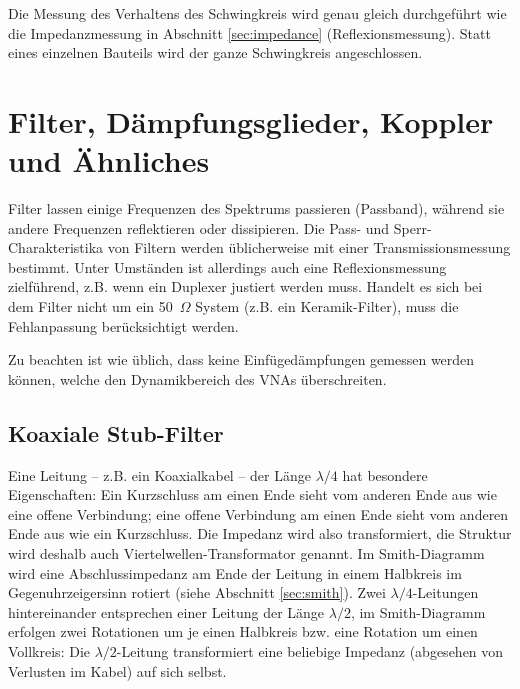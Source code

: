 \documentclass[twoside,a4paper,11pt,halfparskip,DIV=11,notitlepage]{scrartcl}
\begin{document}

Die Messung des Verhaltens des Schwingkreis wird genau gleich durchgeführt wie die
Impedanzmessung in Abschnitt \ref{sec:impedance} (Reflexionsmessung). Statt
eines einzelnen Bauteils wird der ganze Schwingkreis angeschlossen.

\newpage %
\section{Filter, Dämpfungsglieder, Koppler und Ähnliches}\label{sec:filter}
Filter lassen einige Frequenzen des Spektrums passieren (Passband), während
sie andere Frequenzen reflektieren oder dissipieren. Die Pass- und
Sperr-Charakteristika von Filtern werden üblicherweise mit einer
Transmissionsmessung bestimmt. Unter Umständen ist allerdings auch eine
Reflexionsmessung zielführend, z.B. wenn ein Duplexer justiert werden muss.
Handelt es sich bei dem Filter nicht um ein 50~$\Omega$ System (z.B. ein
Keramik-Filter), muss die Fehlanpassung berücksichtigt werden.

Zu beachten ist wie üblich, dass keine Einfügedämpfungen gemessen werden
können, welche den Dynamikbereich des VNAs überschreiten.

\subsection{Koaxiale Stub-Filter}\label{sec:stubfilter}
Eine Leitung -- z.B. ein Koaxialkabel -- der Länge $\lambda/4$ hat besondere
Eigenschaften: Ein Kurzschluss am einen Ende sieht vom anderen Ende aus wie
eine offene Verbindung; eine offene Verbindung am einen Ende sieht vom anderen
Ende aus wie ein Kurzschluss. Die Impedanz wird also transformiert, die
Struktur wird deshalb auch Viertelwellen-Transformator genannt. Im Smith-Diagramm
wird eine Abschlussimpedanz am Ende der Leitung in einem Halbkreis im Gegenuhrzeigersinn
rotiert (siehe Abschnitt \ref{sec:smith}). Zwei $\lambda/4$-Leitungen
hintereinander entsprechen einer Leitung der Länge $\lambda/2$, im
Smith-Diagramm erfolgen zwei Rotationen um je einen Halbkreis bzw. eine
Rotation um einen Vollkreis: Die $\lambda/2$-Leitung transformiert eine
beliebige Impedanz (abgesehen von Verlusten im Kabel) auf sich selbst.
\end{document}
